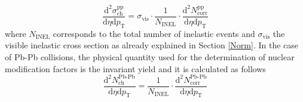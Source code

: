 \documentclass[12pt,a4paper]{report}
\begin{document}
\begin{equation}
\dfrac{\text{d}^2 \sigma^\text{pp}_\text{ch} }{\text{d}\eta \text{d}p_\text{T}} = \sigma_\text{vis} \cdot \dfrac{1}{N_\text{INEL}} \cdot \dfrac{\text{d}^2 N^\text{pp}	_\text{corr}}{\text{d}\eta \text{d}p_\text{T}}
\end{equation}
where $N_\text{INEL}$ corresponds to the total number of inelastic events and $\sigma_\text{vis}$ the visible inelastic cross section as already explained in Section \ref{Norm}. 
In the case of Pb-Pb collisions, the physical quantity used for the determination of nuclear modification factors is the invariant yield and it is calculated as follows
\begin{equation}
\dfrac{\text{d}^2 N^\text{Pb-Pb}_\text{ch}}{\text{d}\eta \text{d}p_\text{T}} = \dfrac{1}{N_\text{INEL}} \cdot \dfrac{\text{d}^2 N^\text{Pb-Pb}_\text{corr}}{\text{d}\eta \text{d}p_\text{T}}
\end{equation}
\end{document}
